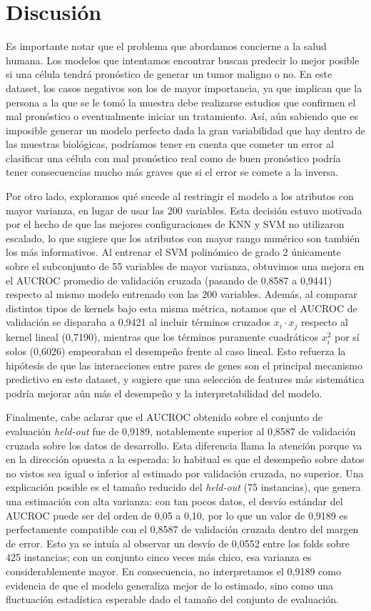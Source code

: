 \documentclass[10pt,a4paper]{article}
\begin{document}
\section{Discusión}
Es importante notar que el problema que abordamos concierne a la salud humana. Los modelos que intentamos encontrar buscan predecir lo mejor posible si una célula tendrá pronóstico de generar un tumor maligno o no. En este dataset, los casos negativos son los de mayor importancia, ya que implican que la persona a la que se le tomó la muestra debe realizarse estudios que confirmen el mal pronóstico o eventualmente iniciar un tratamiento. Así, aún sabiendo que es imposible generar un modelo perfecto dada la gran variabilidad que hay dentro de las muestras biológicas, podríamos tener en cuenta que cometer un error al clasificar una célula con mal pronóstico real como de buen pronóstico podría tener consecuencias mucho más graves que si el error se comete a la inversa. 

Por otro lado, exploramos qué sucede al restringir el modelo a los atributos con mayor varianza, en lugar de usar las 200 variables. Esta decisión estuvo motivada por el hecho de que las mejores configuraciones de KNN y SVM no utilizaron escalado, lo que sugiere que los atributos con mayor rango numérico son también los más informativos. Al entrenar el SVM polinómico de grado 2 únicamente sobre el subconjunto de 55 variables de mayor varianza, obtuvimos una mejora en el AUCROC promedio de validación cruzada (pasando de 0,8587 a 0,9441) respecto al mismo modelo entrenado con las 200 variables. Además, al comparar distintos tipos de kernels bajo esta misma métrica, notamos que el AUCROC de validación se disparaba a 0,9421 al incluir términos cruzados $x_i \cdot x_j$ respecto al kernel lineal (0,7190), mientras que los términos puramente cuadráticos $x_i^2$ por sí solos (0,6026) empeoraban el desempeño frente al caso lineal. Esto refuerza la hipótesis de que las interacciones entre pares de genes son el principal mecanismo predictivo en este dataset, y sugiere que una selección de features más sistemática podría mejorar aún más el desempeño y la interpretabilidad del modelo.

Finalmente, cabe aclarar que el AUCROC obtenido sobre el conjunto de evaluación \textit{held-out} fue de 0,9189, notablemente superior al 0,8587 de validación cruzada sobre los datos de desarrollo. Esta diferencia llama la atención porque va en la dirección opuesta a la esperada: lo habitual es que el desempeño sobre datos no vistos sea igual o inferior al estimado por validación cruzada, no superior. Una explicación posible es el tamaño reducido del \textit{held-out} (75 instancias), que genera una estimación con alta varianza: con tan pocos datos, el desvío estándar del AUCROC puede ser del orden de 0,05 a 0,10, por lo que un valor de 0,9189 es perfectamente compatible con el 0,8587 de validación cruzada dentro del margen de error. Esto ya se intuía al observar un desvío de 0,0552 entre los folds sobre 425 instancias; con un conjunto cinco veces más chico, esa varianza es considerablemente mayor. En consecuencia, no interpretamos el 0,9189 como evidencia de que el modelo generaliza mejor de lo estimado, sino como una fluctuación estadística esperable dado el tamaño del conjunto de evaluación.
\end{document}

